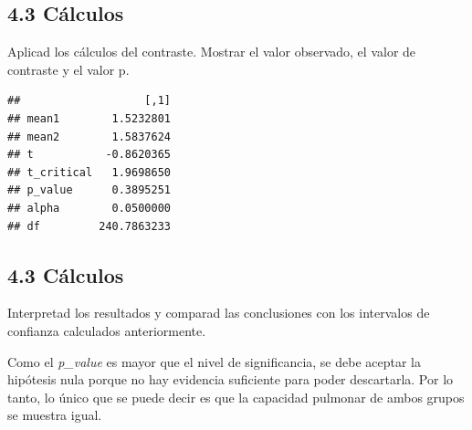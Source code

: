 \documentclass[
]{article}
\newenvironment{Shaded}{\begin{snugshade}}{\end{snugshade}}
\newcommand{\DecValTok}[1]{\textcolor[rgb]{0.00,0.00,0.81}{#1}}
\newcommand{\FunctionTok}[1]{\textcolor[rgb]{0.00,0.00,0.00}{#1}}
\newcommand{\NormalTok}[1]{#1}
\newcommand{\OtherTok}[1]{\textcolor[rgb]{0.56,0.35,0.01}{#1}}
\newcommand{\SpecialCharTok}[1]{\textcolor[rgb]{0.00,0.00,0.00}{#1}}
\newcommand{\StringTok}[1]{\textcolor[rgb]{0.31,0.60,0.02}{#1}}
\begin{document}
\vspace{0.3cm}

\hypertarget{cuxe1lculos}{%
\subsection{4.3 Cálculos}\label{cuxe1lculos}}

Aplicad los cálculos del contraste. Mostrar el valor observado, el valor
de contraste y el valor p.

\vspace{0.3cm}

\begin{Shaded}
\end{Shaded}

\begin{verbatim}
##                   [,1]
## mean1        1.5232801
## mean2        1.5837624
## t           -0.8620365
## t_critical   1.9698650
## p_value      0.3895251
## alpha        0.0500000
## df         240.7863233
\end{verbatim}

\vspace{0.3cm}

\hypertarget{cuxe1lculos-1}{%
\subsection{4.3 Cálculos}\label{cuxe1lculos-1}}

Interpretad los resultados y comparad las conclusiones con los
intervalos de confianza calculados anteriormente.

\vspace{0.3cm}

Como el \emph{p\_value} es mayor que el nivel de significancia, se debe
aceptar la hipótesis nula porque no hay evidencia suficiente para poder
descartarla. Por lo tanto, lo único que se puede decir es que la
capacidad pulmonar de ambos grupos se muestra igual.
\end{document}
